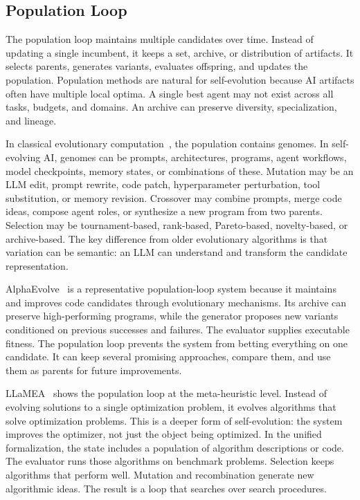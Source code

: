 \subsection{Population Loop}
\label{subsec:taxonomy-population}

The population loop maintains multiple candidates over time.  Instead of updating a single incumbent, it keeps a set, archive, or distribution of artifacts.  It selects parents, generates variants, evaluates offspring, and updates the population.  Population methods are natural for self-evolution because AI artifacts often have multiple local optima.  A single best agent may not exist across all tasks, budgets, and domains.  An archive can preserve diversity, specialization, and lineage.

In classical evolutionary computation~\cite{stanley2002evolving,real2019regularized}, the population contains genomes.  In self-evolving AI, genomes can be prompts, architectures, programs, agent workflows, model checkpoints, memory states, or combinations of these.  Mutation may be an LLM edit, prompt rewrite, code patch, hyperparameter perturbation, tool substitution, or memory revision.  Crossover may combine prompts, merge code ideas, compose agent roles, or synthesize a new program from two parents.  Selection may be tournament-based, rank-based, Pareto-based, novelty-based, or archive-based.  The key difference from older evolutionary algorithms is that variation can be semantic: an LLM can understand and transform the candidate representation.

AlphaEvolve~\cite{alphaevolve2025} is a representative population-loop system because it maintains and improves code candidates through evolutionary mechanisms.  Its archive can preserve high-performing programs, while the generator proposes new variants conditioned on previous successes and failures.  The evaluator supplies executable fitness.  The population loop prevents the system from betting everything on one candidate.  It can keep several promising approaches, compare them, and use them as parents for future improvements.

LLaMEA~\cite{llamea2024} shows the population loop at the meta-heuristic level.  Instead of evolving solutions to a single optimization problem, it evolves algorithms that solve optimization problems.  This is a deeper form of self-evolution: the system improves the optimizer, not just the object being optimized.  In the unified formalization, the state includes a population of algorithm descriptions or code.  The evaluator runs those algorithms on benchmark problems.  Selection keeps algorithms that perform well.  Mutation and recombination generate new algorithmic ideas.  The result is a loop that searches over search procedures.

